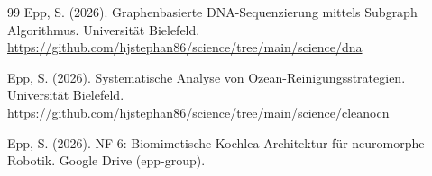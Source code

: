 ﻿\documentclass[a4paper,12pt]{article}
\theoremstyle{definition}
\begin{document}
\begin{thebibliography}{99}
Epp, S. (2026).
Graphenbasierte DNA-Sequenzierung mittels Subgraph Algorithmus.
Universit\"at Bielefeld.
\url{https://github.com/hjstephan86/science/tree/main/science/dna}

Epp, S. (2026).
Systematische Analyse von Ozean-Reinigungsstrategien.
Universit\"at Bielefeld.
\url{https://github.com/hjstephan86/science/tree/main/science/cleanocn}

Epp, S. (2026).
NF-6: Biomimetische Kochlea-Architektur f\"ur neuromorphe Robotik.
Google Drive (epp-group).

\end{thebibliography}
\end{document}
